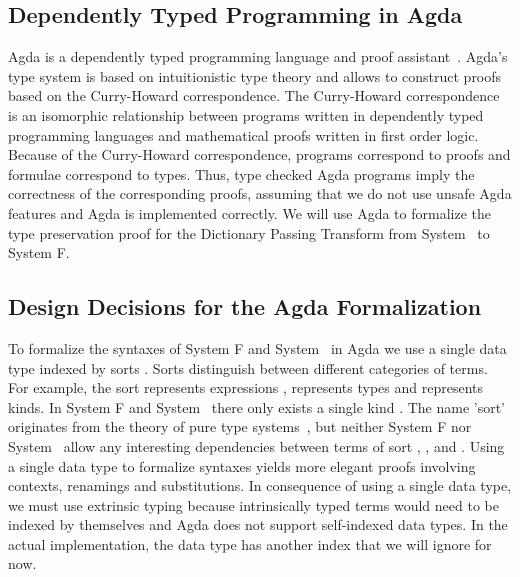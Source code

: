 \subsection{Dependently Typed Programming in Agda}
Agda is a dependently typed programming language and proof assistant~\cite{agda}.
Agda's type system is based on intuitionistic type theory and allows to construct proofs based on the Curry-Howard correspondence. 
The Curry-Howard correspondence is an isomorphic relationship between programs written in dependently typed programming languages and mathematical proofs written in first order logic. 
Because of the Curry-Howard correspondence, programs correspond to proofs and formulae correspond to types. 
Thus, type checked Agda programs imply the correctness of the corresponding proofs, assuming that we do not use unsafe Agda features and Agda is implemented correctly. 
We will use Agda to formalize the type preservation proof for the Dictionary Passing Transform from System \Fo\ to System F.

\subsection{Design Decisions for the Agda Formalization}
To formalize the syntaxes of System F and System \Fo\ in Agda we use a single data type  indexed by sorts . 
Sorts distinguish between different categories of terms.
For example, the sort  represents expressions ,  represents types  and  represents kinds. In System F and System \Fo\ there only exists a single kind . 
The name 'sort' originates from the theory of pure type systems~\cite{pts}, but neither System F nor System \Fo\ allow any interesting dependencies between terms of sort , , and .
Using a single data type to formalize syntaxes yields more elegant proofs involving contexts, renamings and substitutions. 
In consequence of using a single data type, we must use extrinsic typing because intrinsically typed terms would need to be indexed by themselves and Agda does not support self-indexed data types. 
In the actual implementation, the data type  has another index  that we will ignore for now.


